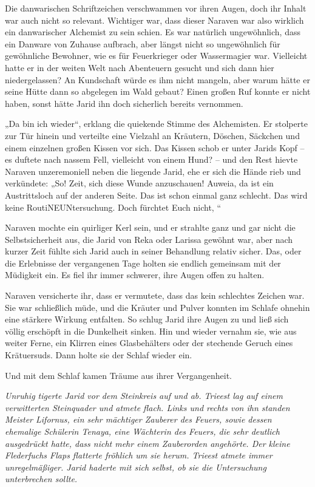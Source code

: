 Die danwarischen Schriftzeichen verschwammen vor ihren Augen, doch ihr Inhalt war auch nicht so relevant. Wichtiger war, dass dieser Naraven war also wirklich ein danwarischer Alchemist zu sein schien. Es war natürlich ungewöhnlich, dass ein Danware von Zuhause aufbrach, aber längst nicht so ungewöhnlich für gewöhnliche Bewohner, wie es für Feuerkrieger oder Wassermagier war. Vielleicht hatte er in der weiten Welt nach Abenteuern gesucht und sich dann hier niedergelassen? An Kundschaft würde es ihm nicht mangeln, aber warum hätte er seine Hütte dann so abgelegen im Wald gebaut? Einen großen Ruf konnte er nicht haben, sonst hätte Jarid ihn doch sicherlich bereits vernommen.

„Da bin ich wieder“, erklang die quiekende Stimme des Alchemisten. Er stolperte zur Tür hinein und verteilte eine Vielzahl an Kräutern, Döschen, Säckchen und einem einzelnen großen Kissen vor sich. Das Kissen schob er unter Jarids Kopf – es duftete nach nassem Fell, vielleicht von einem Hund? – und den Rest hievte Naraven unzeremoniell neben die liegende Jarid, ehe er sich die Hände rieb und verkündete: „So! Zeit, sich diese Wunde anzuschauen! Auweia, da ist ein Austrittsloch auf der anderen Seite. Das ist schon einmal ganz schlecht. Das wird keine RoutiNEUNtersuchung. Doch fürchtet Euch nicht, “

Naraven mochte ein quirliger Kerl sein, und er strahlte ganz und gar nicht die Selbstsicherheit aus, die Jarid von Reka oder Larissa gewöhnt war, aber nach kurzer Zeit fühlte sich Jarid auch in seiner Behandlung relativ sicher. Das, oder die Erlebnisse der vergangenen Tage holten sie endlich gemeinsam mit der Müdigkeit ein. Es fiel ihr immer schwerer, ihre Augen offen zu halten.

Naraven versicherte ihr, dass er vermutete, dass das kein schlechtes Zeichen war. Sie war schließlich müde, und die Kräuter und Pulver konnten im Schlafe ohnehin eine stärkere Wirkung entfalten. So schlug Jarid ihre Augen zu und ließ sich völlig erschöpft in die Dunkelheit sinken. Hin und wieder vernahm sie, wie aus weiter Ferne, ein Klirren eines Glasbehälters oder der stechende Geruch eines Krätuersuds. Dann holte sie der Schlaf wieder ein.

Und mit dem Schlaf kamen Träume aus ihrer Vergangenheit.







\textit{Unruhig tigerte Jarid vor dem Steinkreis auf und ab. Trieest lag auf einem verwitterten Steinquader und atmete flach. Links und rechts von ihn standen Meister Lifornus, ein sehr mächtiger Zauberer des Feuers, sowie dessen ehemalige Schülerin Tenaya, eine Wächterin des Feuers, die sehr deutlich ausgedrückt hatte, dass nicht mehr einem Zauberorden angehörte. Der kleine Flederfuchs Flaps flatterte fröhlich um sie herum. Trieest atmete immer unregelmäßiger. Jarid haderte mit sich selbst, ob sie die Untersuchung unterbrechen sollte.}

